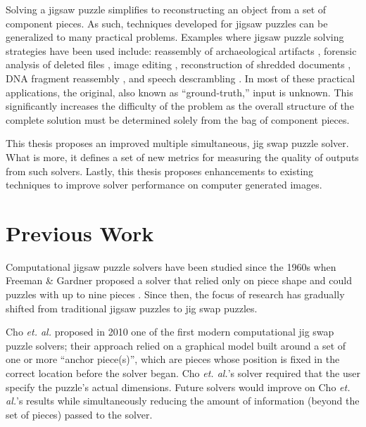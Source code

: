 \documentclass{report}
\begin{document}
Solving a jigsaw puzzle simplifies to reconstructing an object from a set of component pieces.  As such, techniques developed for jigsaw puzzles can be generalized to many practical problems.  Examples where jigsaw puzzle solving strategies have been used include: reassembly of archaeological artifacts \cite{brown2008, koller2006}, forensic analysis of deleted files \cite{garfinkel2010}, image editing \cite{cho2008}, reconstruction of shredded documents \cite{zhu2008}, DNA fragment reassembly \cite{marande2007}, and speech descrambling \cite{zhao2007}.  In most of these practical applications, the original, also known as ``ground-truth,'' input is unknown.  This significantly increases the difficulty of the problem as the overall structure of the complete solution must be determined solely from the bag of component pieces.

This thesis proposes an improved multiple simultaneous, jig swap puzzle solver.  What is more, it defines a set of new metrics for measuring the quality of outputs from such solvers.  Lastly, this thesis proposes enhancements to existing techniques to improve solver performance on computer generated images.




\pagebreak
\section{Previous Work}\label{sec:previousWork}

Computational jigsaw puzzle solvers have been studied since the 1960s when Freeman \& Gardner proposed a solver that relied only on piece shape and could puzzles with up to nine pieces \cite{freeman1964}.  Since then, the focus of research has gradually shifted from traditional jigsaw puzzles to jig swap puzzles.  

Cho \textit{et. al.} \citep{cho2010} proposed in 2010 one of the first modern computational jig swap puzzle solvers; their approach relied on a graphical model built around a set of one or more ``anchor piece(s)'', which are pieces whose position is fixed in the correct location before the solver began.  Cho \textit{et. al.}'s solver required that the user specify the puzzle's actual dimensions.  Future solvers would improve on Cho \textit{et. al.}'s results while simultaneously reducing the amount of information (beyond the set of pieces) passed to the solver.
\end{document}
